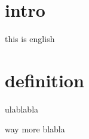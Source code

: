 \section{intro}
this is english

\section{definition}
ulablabla

\cite{lee2013introduction}
way more blabla

